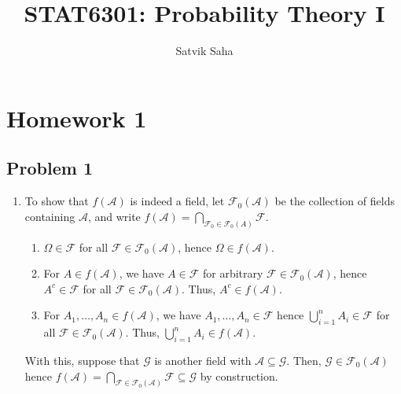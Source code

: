 \documentclass[11pt]{article}
\title{\bfseries STAT6301: Probability Theory I}
\author{Satvik Saha}
\date{}
\begin{document}
    \maketitle

    \section*{Homework 1}

    \subsection*{Problem 1}

    \begin{enumerate}
        \item To show that $f(\mathcal{A})$ is indeed a field, let
        $\mathscr{F}_0(\mathcal{A})$ be the collection of fields containing
        $\mathcal{A}$, and write $f(\mathcal{A}) = \bigcap_{\mathcal{F}_0 \in
        \mathscr{F}_0(A)} \mathcal{F}$.
        \begin{enumerate}
            \item $\Omega \in \mathcal{F}$ for all $\mathcal{F} \in
            \mathscr{F}_0(\mathcal{A})$, hence $\Omega \in f(\mathcal{A})$.

            \item For $A \in f(\mathcal{A})$, we have $A \in \mathcal{F}$ for
            arbitrary $\mathcal{F} \in \mathscr{F}_0(\mathcal{A})$, hence $A^c
            \in \mathcal{F}$ for all $\mathcal{F} \in
            \mathscr{F}_0(\mathcal{A})$.
            Thus, $A^c \in f(\mathcal{A})$.

            \item For $A_1, \dots, A_n \in f(\mathcal{A})$, we have $A_1,
            \dots, A_n \in \mathcal{F}$ hence $\bigcup_{i = 1}^n A_i \in
            \mathcal{F}$ for all $\mathcal{F} \in \mathscr{F}_0(\mathcal{A})$.
            Thus, $\bigcup_{i = 1}^n A_i \in f(\mathcal{A})$.
        \end{enumerate}

        With this, suppose that $\mathcal{G}$ is another field with
        $\mathcal{A} \subseteq \mathcal{G}$.
        Then, $\mathcal{G} \in \mathscr{F}_0(\mathcal{A})$ hence
        $f(\mathcal{A}) = \bigcap_{\mathcal{F} \in \mathscr{F}_0(\mathcal{A})}
        \mathcal{F} \subseteq \mathcal{G}$ by construction.



\end{enumerate}
\end{document}
